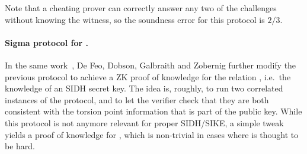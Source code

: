Note that a cheating prover can correctly answer any two of the challenges without knowing the witness, so the soundness error for this protocol is $2/3$.



\paragraph{Sigma protocol for \R[SIDH].}
In the same work~\cite{DFDGZ21}, De Feo, Dobson, Galbraith and Zobernig further modify the previous protocol to achieve a ZK proof of knowledge for the relation \R[SIDH], i.e.\ the knowledge of an SIDH secret key.
The idea is, roughly, to run two correlated instances of the protocol, and to let the verifier check that they are both consistent with the torsion point information that is part of the public key.
While this protocol is not anymore relevant for proper SIDH/SIKE, a simple tweak yields a proof of knowledge for \R[M-SIDH], which is non-trivial in cases where \R[M-SIDH] is thought to be hard.

